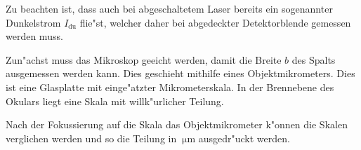 			\newline

			Zu beachten ist, dass auch bei abgeschaltetem Laser bereits ein sogenannter Dunkelstrom $I_{\text{du}}$ flie"st, welcher daher bei abgedeckter Detektorblende gemessen werden muss.


			Zun"achst muss das Mikroskop geeicht werden, damit die Breite $b$ des Spalts ausgemessen werden kann. Dies geschieht mithilfe eines Objektmikrometers. Dies ist eine Glasplatte mit einge"atzter Mikrometerskala. In der Brennebene des Okulars liegt eine Skala mit willk"urlicher Teilung. 

			Nach der Fokussierung auf die Skala das Objektmikrometer k"onnen die Skalen verglichen werden und so die Teilung in $\SI{}{\micro \meter}$ ausgedr"uckt werden.
